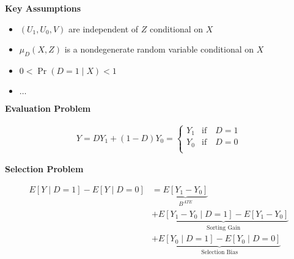 \begin{frame}\textbf{Key Assumptions}

\begin{itemize}\setlength\itemsep{1em}
\item $(U_1, U_0, V)$ are independent of $Z$ conditional on $X$
\item $\mu_D(X, Z)$ is a nondegenerate random variable conditional on $X$
\item $0 < \Pr(D=1 \mid X) < 1$
\item $\hdots$
\end{itemize}
\end{frame}
\begin{frame}\textbf{Evaluation Problem}\vspace{0.3cm}

\begin{align*}
Y = D Y_1 + (1 - D)Y_0 =
\begin{cases}
Y_{1} & \text{if}\quad D = 1 \\
Y_{0} & \text{if}\quad D = 0 \\
\end{cases}
\end{align*}\end{frame}
\begin{frame}\textbf{Selection Problem}\vspace{0.3cm}

\begin{align*}
E[Y\mid D = 1] - E[Y\mid D = 0] & = \underbrace{E[Y_1 - Y_0]}_{B^{ATE}} \\
	 							& + \underbrace{E[Y_1 - Y_0 \mid D = 1] - E[Y_1 - Y_0]}_{\text{Sorting Gain}} \\
								& + \underbrace{E[Y_0\mid D = 1] - E[Y_0 \mid D = 0]}_{\text{Selection Bias}}
\end{align*}
\end{frame}
